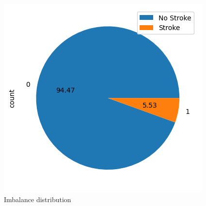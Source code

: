 \documentclass[twocolumn, 9pt]{extarticle}
\begin{document}
\begin{figure}[h]
\centering
\includegraphics[scale=0.4]{images/imbalance_pie.png}
\caption{Imbalance distribution}
\label{fig:dataset_imbalance}
\end{figure}
\end{document}
